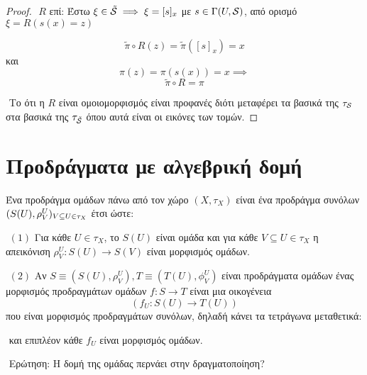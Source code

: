 \begin{proof}
    $ $\newline
    $R$ επί: Έστω $\xi \in \tilde{\mathcal{S}} \implies \xi = [ s]_x$ με $ s \in \Gamma(U,\mathcal{S})$, από ορισμό $\xi = R(s(x) = z)$
    
    
    $$\tilde{\pi} \circ R(z) = \tilde{\pi} ([s]_x) = x$$ και 
    $$\pi(z) = \pi(s(x)) = x \implies $$
    $$\tilde{\pi}\circ R = \pi$$

    $ $\newline
    Το ότι η $R$ είναι ομοιομορφισμός είναι προφανές διότι μεταφέρει τα βασικά της $\tau_{\mathcal{S}}$ στα βασικά της $\tau_{\tilde{\mathcal{S}}}$ όπου αυτά είναι οι εικόνες των τομών.
\end{proof}

\section*{Προδράγματα με αλγεβρική δομή}

\begin{defn}
Ένα προδράγμα ομάδων πάνω από τον χώρο $(X,\tau_X)$ είναι ένα προδράγμα συνόλων $(S(U),\rho^U_V)_{V\subseteq U\in \tau_X}$ έτσι ώστε:

$ $\newline
$(1)$ Για κάθε $U\in \tau_X$, το $S(U)$ είναι ομάδα και για κάθε $V\subseteq U \in \tau_X$ η απεικόνιση $\rho^U_V: S(U) \rightarrow S(V)$ είναι μορφισμός ομάδων.


$ $\newline
$(2)$ Αν $S\equiv (S(U),\rho^U_V), T\equiv (T(U),\phi^U_V)$ είναι προδράγματα ομάδων ένας μορφισμός προδραγμάτων ομάδων $f:S\rightarrow T$ είναι μια οικογένεια
$$(f_U:S(U)\rightarrow T(U))$$ που είναι μορφισμός προδραγμάτων συνόλων, δηλαδή κάνει τα τετράγωνα μεταθετικά:

\begin{figure}[H]
    \centering
\end{figure}

$ $\newline
και επιπλέον κάθε $f_U$ είναι μορφισμός ομάδων.

\end{defn}


$ $\newline
Ερώτηση: Η δομή της ομάδας περνάει στην δραγματοποίηση?


